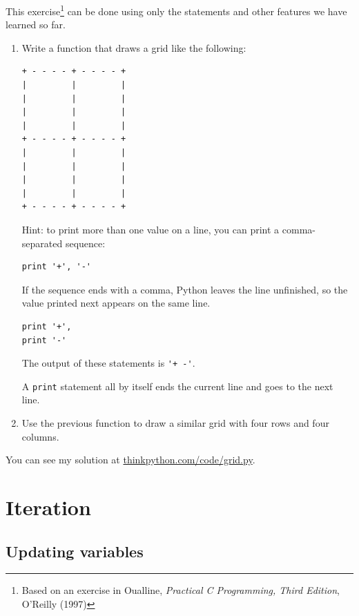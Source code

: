 \documentclass[10pt]{book}
\begin{document}
\begin{ex}
This exercise\footnote{Based on an exercise in Oualline, {\em
    Practical C Programming, Third Edition}, O'Reilly (1997)} can be
done using only the statements and other features we have learned so
far.  


\begin{enumerate}

\item Write a function that draws a grid like the
  following:

\beforeverb
\begin{verbatim}
+ - - - - + - - - - +
|         |         |
|         |         |
|         |         |
|         |         |
+ - - - - + - - - - +
|         |         |
|         |         |
|         |         |
|         |         |
+ - - - - + - - - - +
\end{verbatim}
\afterverb
%
Hint: to print more than one value on a line, you can print
a comma-separated sequence:

\beforeverb
\begin{verbatim}
print '+', '-'
\end{verbatim}
\afterverb
%
If the sequence ends with a comma, Python leaves the line unfinished,
so the value printed next appears on the same line.

\beforeverb
\begin{verbatim}
print '+', 
print '-'
\end{verbatim}
\afterverb
%
The output of these statements is \verb"'+ -'".

A {\tt print} statement all by itself ends the current line and
goes to the next line.

\item Use the previous function to draw a similar grid
with four rows and four columns.

\end{enumerate}

You can see my solution at \url{thinkpython.com/code/grid.py}.

\end{ex}



\chapter{Iteration}


\section{Updating variables}
\label{update}
\end{document}
